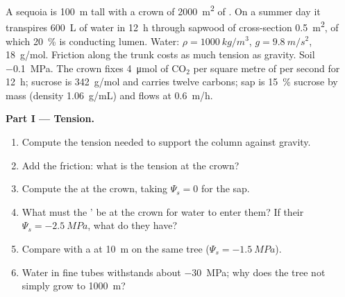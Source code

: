 \begin{problem}
\label{pb:b1:plant-transport:1}
A sequoia is \qty{100}{m} tall with a crown of \qty{2000}{m^2} of .
On a summer day it transpires \qty{600}{L} of water in \qty{12}{h}
through sapwood of cross-section \qty{0.5}{m^2}, of which \qty{20}{\%}
is conducting lumen. Water: $\rho = \qty{1000}{kg/m^3}$, $g =
\qty{9.8}{m/s^2}$, \qty{18}{g/mol}. Friction along the trunk costs as
much tension as gravity. Soil  \qty{-0.1}{MPa}. The
crown fixes \qty{4}{\micro mol} of $\mathrm{CO_2}$ per square metre of
 per second for \qty{12}{h}; sucrose is \qty{342}{g/mol} and
carries twelve carbons;  sap is \qty{15}{\%} sucrose by mass
(density \qty{1.06}{g/mL}) and flows at \qty{0.6}{m/h}.

\medskip
\noindent\textbf{Part I --- Tension.}
\begin{enumerate}
  \item Compute the tension needed to support the column against
        gravity.
  \item Add the friction: what is the  tension at the crown?
  \item Compute the   at the crown, taking
        $\Psi_s = 0$ for the sap.
  \item What must the  '  be at the crown for
        water to enter them? If their $\Psi_s = \qty{-2.5}{MPa}$, what
         do they have?
  \item Compare with a  at \qty{10}{m} on the same tree ($\Psi_s =
        \qty{-1.5}{MPa}$).
  \item Water in fine tubes withstands about \qty{-30}{MPa}; why does
        the tree not simply grow to \qty{1000}{m}?
\end{enumerate}


\end{problem}
